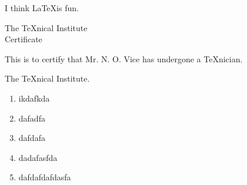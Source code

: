 \documentclass[fleqn]{jsarticle}
\begin{document}
I think \LaTeX is fun.
\begin{center}
  The \TeX nical Institute \\[.75cm] Certificate
\end{center}
\noindent This is to certify that Mr. N. O. Vice has undergone a \TeX nician.
\begin{flushright}
  The \TeX nical Institute.
\end{flushright}
\begin{multicols}{2}
\begin{enumerate}
  \item ikdafkda \\
  \item dafadfa \\
  \item dafdafa
  \item dadafasfda\\
  \item dafdafdafdasfa \\
\end{enumerate}
\end{multicols}
\end{document}
